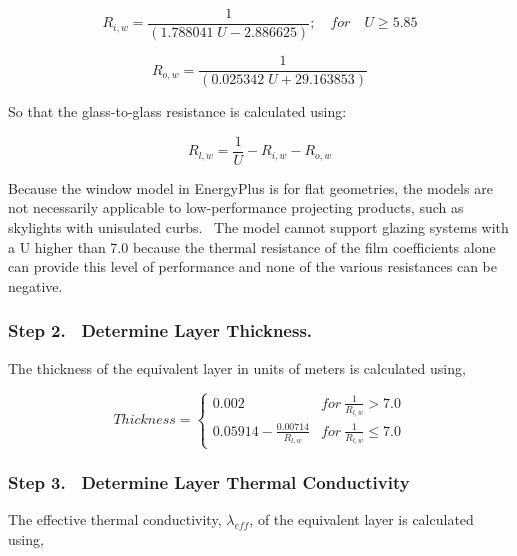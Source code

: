 \begin{equation}
{R_{i,w}} = \frac{1}{{(1.788041\;U - 2.886625)}};\quad for\quad U \ge 5.85
\end{equation}

\begin{equation}
{R_{o,w}} = \frac{1}{{(0.025342\;U + 29.163853)}}
\end{equation}

So that the glass-to-glass resistance is calculated using:

\begin{equation}
{R_{l,w}} = \frac{1}{U} - {R_{i,w}} - {R_{o,w}}
\end{equation}

Because the window model in EnergyPlus is for flat geometries, the models are not necessarily applicable to low-performance projecting products, such as skylights with unisulated curbs.~ The model cannot support glazing systems with a U higher than 7.0 because the thermal resistance of the film coefficients alone can provide this level of performance and none of the various resistances can be negative.

\subsubsection{Step 2.~ Determine Layer Thickness.}\label{step-2.-determine-layer-thickness.}

The thickness of the equivalent layer in units of meters is calculated using,

\begin{equation}
  Thickness = \left\{
                \begin{array}{cl}
                  0.002                             & for~\frac{1}{R_{l,w}} > 7.0 \\
                  0.05914 - \frac{0.00714}{R_{l,w}} & for~\frac{1}{R_{l,w}} \leq 7.0
                \end{array}
              \right.
\end{equation}

\subsubsection{Step 3.~ Determine Layer Thermal Conductivity}\label{step-3.-determine-layer-thermal-conductivity}

The effective thermal conductivity, \({\lambda_{eff}}\), of the equivalent layer is calculated using,

